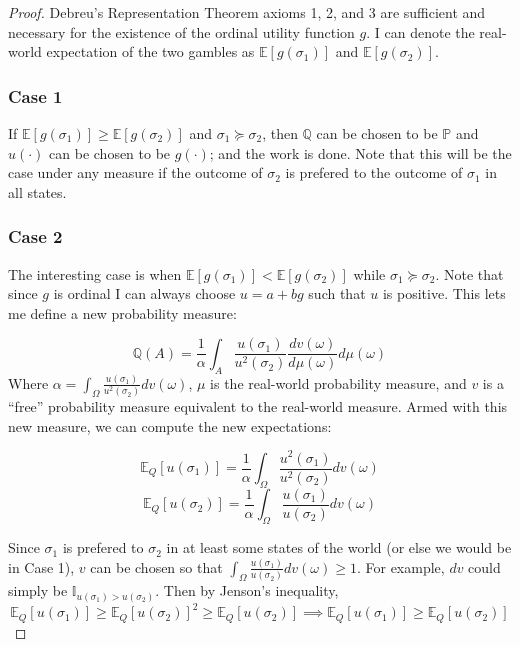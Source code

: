 \documentclass{article}
\begin{document}
\begin{proof}
Debreu's Representation Theorem axioms 1, 2, and 3 are sufficient and necessary for the existence of the ordinal utility function \(g\).  I can denote the real-world expectation of the two gambles as \(\mathbb{E}[g(\sigma_1)]\) and \(\mathbb{E}[g(\sigma_2)]\). 

\subsubsection*{Case 1}

If \(\mathbb{E}[g(\sigma_1)]\geq\mathbb{E}[g(\sigma_2)]\) and \(\sigma_1 \succeq \sigma_2\), then \(\mathbb{Q}\) can be chosen to be \(\mathbb{P}\) and \(u(\cdot)\) can be chosen to be \(g(\cdot)\); and the work is done. Note that this will be the case under any measure if the outcome of \(\sigma_2\) is prefered to the outcome of \(\sigma_1\) in all states.

\subsubsection*{Case 2}

The interesting case is when \(\mathbb{E}[g(\sigma_1)]<\mathbb{E}[g(\sigma_2)]\) while \(\sigma_1 \succeq \sigma_2\).  Note that since \(g\) is ordinal I can always choose \(u=a+bg\) such that \(u\) is positive.  This lets me define a new probability measure:

\[\mathbb{Q}(A)=\frac{1}{\alpha}\int_A \frac{u(\sigma_1)}{u^2(\sigma_2)} \frac{dv(\omega) }{ d\mu(\omega)} d\mu(\omega)\] 
Where \(\alpha=\int_\Omega \frac{u(\sigma_1)}{u^2(\sigma_2)} dv(\omega) \), \(\mu\) is the real-world probability measure, and \(v\) is a ``free'' probability measure equivalent to the real-world measure.  Armed with this new measure, we can compute the new expectations:

\[\mathbb{E}_Q[u(\sigma_1)]=\frac{1}{\alpha} \int_\Omega \frac{u^2(\sigma_1)}{u^2(\sigma_2)} dv(\omega)\]
\[\mathbb{E}_Q[u(\sigma_2)]=\frac{1}{\alpha} \int_\Omega \frac{u(\sigma_1)}{u(\sigma_2)} dv(\omega)\]

Since \(\sigma_1\) is prefered to \(\sigma_2\) in at least some states of the world (or else we would be in Case 1), \(v\) can be chosen so that \(\int_\Omega \frac{u(\sigma_1)}{u(\sigma_2)} dv(\omega)\geq 1\).  For example, \(dv\) could simply be \(\mathbb{I}_{u(\sigma_1)>u(\sigma_2)}\).  Then by Jenson's inequality, 
\[\mathbb{E}_Q[u(\sigma_1)] \geq   \mathbb{E}_Q[u(\sigma_2)]^2 \geq  \mathbb{E}_Q[u(\sigma_2)] \implies \mathbb{E}_Q[u(\sigma_1)] \geq \mathbb{E}_Q[u(\sigma_2)] \]

\end{proof}
\end{document}

